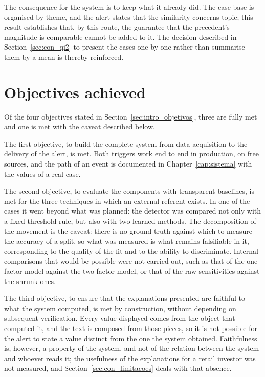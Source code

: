 The consequence for the system is to keep what it already did. The case base is organised by
theme, and the alert states that the similarity concerns topic; this result establishes that, by
this route, the guarantee that the precedent's magnitude is comparable cannot be added to it. The
decision described in Section~\ref{sec:con_qi2} to present the cases one by one rather than
summarise them by a mean is thereby reinforced.

\section{Objectives achieved}
\label{sec:con_objetivos}

Of the four objectives stated in Section~\ref{sec:intro_objetivos}, three are fully met and one is
met with the caveat described below.

The first objective, to build the complete system from data acquisition to the delivery of the
alert, is met. Both triggers work end to end in production, on free sources, and the path of an
event is documented in Chapter~\ref{cap:sistema} with the values of a real case.

The second objective, to evaluate the components with transparent baselines, is met for the
three techniques in which an external referent exists. In one of the cases it went beyond what was
planned: the detector was compared not only with a fixed threshold rule, but also with two learned
methods.
The decomposition of the movement is the caveat: there is no ground truth against which to measure
the accuracy of a split, so what was measured is what remains falsifiable in it, corresponding to
the quality of the fit and to the ability to discriminate. Internal comparisons that would be
possible were not carried out, such as that of the one-factor model against the two-factor model,
or that of the raw sensitivities against the shrunk ones.

The third objective, to ensure that the explanations presented are faithful to what the system
computed, is met by construction, without depending on subsequent verification. Every value displayed comes
from the object that computed it, and the text is composed from those pieces, so it is not possible
for the alert to state a value distinct from the one the system obtained. Faithfulness is, however,
a property of the system, and not of the relation between the system and whoever reads it; the
usefulness of the explanations for a retail investor was not measured, and
Section~\ref{sec:con_limitacoes} deals with that absence.


